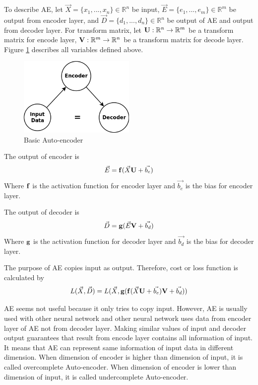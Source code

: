 \documentclass[draft,dvipsnames]{drexel-thesis}
\begin{document}
\begin{thesis}
\begin{enumerate}
To describe AE, let $\vec{X} = \{x_1, ..., x_n\} \in \mathbb{R}^n$ be input, $\vec{E} = \{e_1, ..., e_m\} \in \mathbb{R}^m$ be output from encoder layer, and $\vec{D} = \{d_1, ..., d_n\} \in \mathbb{R}^n$ be output of AE and output from decoder layer. For transform matrix, let $\bold{U}: \mathbb{R}^n \rightarrow \mathbb{R}^m$ be a transform matrix for encode layer, $\bold{V}: \mathbb{R}^m \rightarrow \mathbb{R}^n$ be a transform matrix for decode layer. Figure \ref{fig:basic_AE} describes all variables defined above.

\begin{figure}[t!]
    \centering
    \includegraphics[width=0.5\textwidth]{pictures/figures/basic_AE.png}
    \caption{Basic Auto-encoder}
    \label{fig:basic_AE}
\end{figure}

The output of encoder is
$$\vec{E} = \bold{f}(\vec{X}\bold{U}+\vec{b_e})$$
Where $\bold{f}$ is the activation function for encoder layer and $\vec{b_e}$ is the bias for encoder layer.

The output of decoder is
$$\vec{D} = \bold{g}(\vec{E}\bold{V}+\vec{b_d})$$
Where $\bold{g}$ is the activation function for decoder layer and $\vec{b_d}$ is the bias for decoder layer.

The purpose of AE copies input as output. Therefore, cost or loss function is calculated by
$$L(\vec{X}, \vec{D}) = L(\vec{X}, \bold{g}(\bold{f}(\vec{X}\bold{U}+\vec{b_e})\bold{V}+\vec{b_d}))$$

AE seems not useful because it only tries to copy input. However, AE is usually used with other neural network and other neural network uses data from encoder layer of AE not from decoder layer. Making similar values of input and decoder output guarantees that result from encode layer contains all information of input. It means that AE can represent same information of input data in different dimension. When dimension of encoder is higher than dimension of input, it is called overcomplete Auto-encoder. When dimension of encoder is lower than dimension of input, it is called undercomplete Auto-encoder.


\end{enumerate}
\end{thesis}
\end{document}
